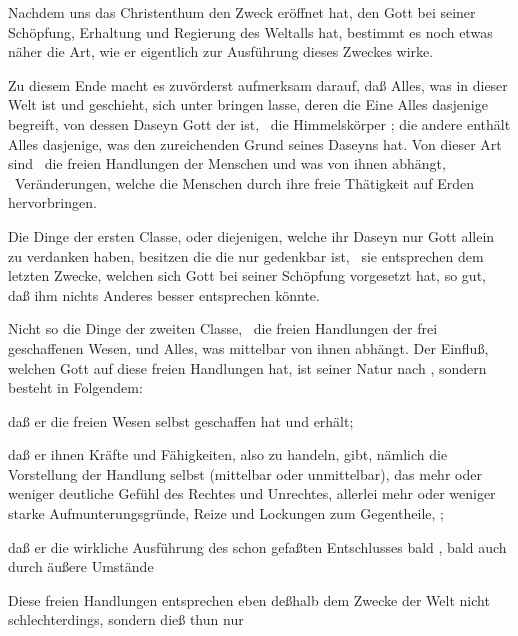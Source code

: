 Nachdem uns das Christenthum den Zweck eröffnet hat, den Gott bei seiner Schöpfung, Erhaltung und Regierung des Weltalls hat, bestimmt es noch etwas näher die Art, wie er eigentlich zur Ausführung dieses Zweckes wirke.
\begin{aufza}
\item Zu diesem Ende macht es zuvörderst aufmerksam darauf, daß Alles, was in dieser Welt ist und geschieht, sich unter  bringen lasse, deren die Eine Alles dasjenige begreift, von dessen Daseyn Gott der  ist, \zB\ die Himmelskörper \udgl ; die andere enthält Alles dasjenige, was den zureichenden Grund seines Daseyns  hat. Von dieser Art sind \zB\ die freien Handlungen der Menschen und was von ihnen abhängt, \zB\ Veränderungen, welche die Menschen durch ihre freie Thätigkeit auf Erden hervorbringen.
\item Die Dinge der ersten Classe, oder diejenigen, welche ihr Daseyn nur Gott allein zu verdanken haben, besitzen die  die nur gedenkbar ist, \dh\ sie entsprechen dem letzten Zwecke, welchen sich Gott bei seiner Schöpfung vorgesetzt hat, so gut, daß ihm nichts Anderes besser entsprechen könnte.
\item Nicht so die Dinge der zweiten Classe, \dh\ die freien Handlungen der frei geschaffenen Wesen, und Alles, was mittelbar von ihnen abhängt. Der Einfluß, welchen Gott auf diese freien Handlungen hat, ist seiner Natur nach , sondern besteht in Folgendem:
\begin{aufzb}
\item daß er die freien Wesen selbst geschaffen hat und erhält;
\item daß er ihnen Kräfte und Fähigkeiten, also zu handeln, gibt, nämlich die Vorstellung der Handlung selbst (mittelbar oder unmittelbar), das mehr oder weniger deutliche Gefühl des Rechtes und Unrechtes, allerlei mehr oder weniger starke Aufmunterungsgründe, Reize und Lockungen zum Gegentheile, \usw ;
\item daß er die wirkliche Ausführung des schon gefaßten Entschlusses bald , bald auch durch äußere Umstände 
\end{aufzb}
\item Diese freien Handlungen entsprechen eben deßhalb dem Zwecke der Welt nicht schlechterdings, sondern dieß thun nur

\end{aufza}
